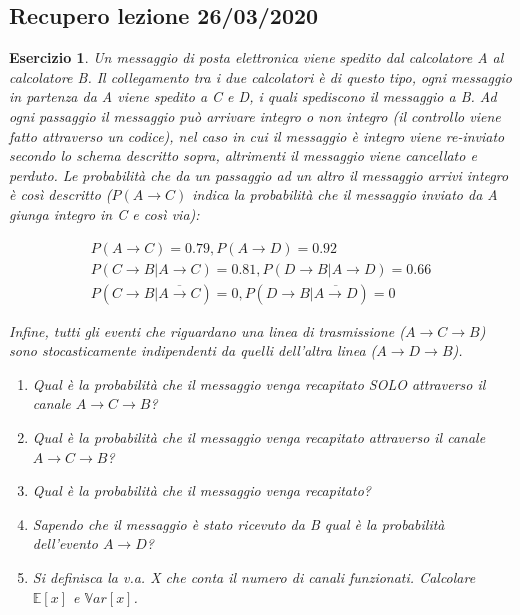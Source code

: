 \documentclass[12pt]{article}
\newtheorem{theorem}{Esercizio}
\newcommand{\mean}[1]{$\mathbb{E}[#1]$}
\newcommand{\varr}[1]{$\mathbb{V}ar[#1]$}
\begin{document}
\subsection{Recupero lezione 26/03/2020}

\begin{theorem}
	Un messaggio di posta elettronica viene spedito dal calcolatore A al calcolatore B. Il collegamento tra i due calcolatori è di questo tipo, ogni messaggio in partenza da A viene spedito a C e D, i quali spediscono il messaggio a B.
	Ad ogni passaggio il messaggio può arrivare integro o non integro (il controllo viene fatto attraverso un codice), nel caso in cui il messaggio è integro viene re-inviato secondo lo schema descritto sopra, altrimenti il messaggio viene cancellato e perduto.
	Le probabilità che da un passaggio ad un altro il messaggio arrivi integro è così descritto ($P(A \rightarrow C)$ indica la probabilità che il messaggio inviato da A giunga integro in C e così via):
	
	\begin{gather*}
		P(A \rightarrow C) = 0.79, P(A \rightarrow D) = 0.92 \\
		P(C \rightarrow B|A \rightarrow C) = 0.81, P(D \rightarrow B|A \rightarrow D) = 0.66 \\
		P(C \rightarrow B|\overline{A \rightarrow C}) = 0, P(D \rightarrow B|\overline{A \rightarrow D}) = 0
	\end{gather*}

	Infine, tutti gli eventi che riguardano una linea di trasmissione ($A \rightarrow C \rightarrow B$) sono stocasticamente indipendenti da quelli dell’altra linea ($A \rightarrow D \rightarrow B$).
	\begin{enumerate}
		\item Qual è la probabilità che il messaggio venga recapitato SOLO attraverso il canale $A \rightarrow C \rightarrow B$?
		\item Qual è la probabilità che il messaggio venga recapitato attraverso il canale $A \rightarrow C \rightarrow B$?
		\item Qual è la probabilità che il messaggio venga recapitato?
		\item Sapendo che il messaggio è stato ricevuto da B qual è la probabilità dell’evento $A \rightarrow D$?
		\item Si definisca la v.a. X che conta il numero di canali funzionati. Calcolare \mean{x} e \varr{x}.
	\end{enumerate}
\end{theorem}
\end{document}
